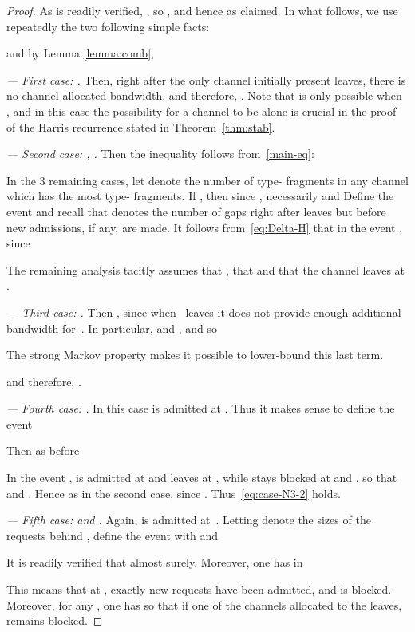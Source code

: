 \documentclass{amsart}
\begin{document}
\begin{proof}
As is readily verified, , so , and hence  as claimed. In what follows, we
use repeatedly the two following simple facts:

and by Lemma \ref{lemma:comb},


\noindent \textit{{--- First case: .}} Then, right after the
only channel initially present leaves, there is no channel allocated bandwidth, and
therefore, . Note that  is only possible
when , and in this case the possibility for a channel
to be alone is crucial in the proof of the Harris recurrence
stated in Theorem~\ref{thm:stab}.



\noindent \textit{{--- Second case: , .}} Then the inequality follows from~\eqref{main-eq}:



In the 3 remaining cases, let  denote the number of type-
fragments in any channel  which has the most type-
fragments. If , then since ,
necessarily  and 
  Define the event  and recall that  denotes the number of gaps
right after  leaves but before new admissions, if any, are
made. It follows from~\eqref{eq:Delta-H} that  in the
event , since
    
The remaining analysis tacitly assumes that , that  and that the channel  leaves at .


\noindent \textit{{--- Third case: .}} Then , since when~ leaves it does not provide enough
additional bandwidth for~. In particular,  and
, and so
    
The strong Markov property makes it possible to lower-bound this
last term.

and therefore, .


    \noindent \textit{{--- Fourth case: .}}
    In this case  is admitted at . Thus it makes sense to define the
    event
    
Then as before
    
In the event ,  is admitted at  and leaves at
, while  stays blocked at  and ,
so that  and . Hence as in the
second case,
 since . Thus~\eqref{eq:case-N3-2} holds.

\noindent \textit{{--- Fifth case:  {\rm and} .}} Again,  is admitted at~. Letting
 denote the sizes of the requests behind , define the event
 with  and
    
It is readily verified that  almost surely.
Moreover, one has in 
    
This means that at , exactly  new requests  have been admitted, and  is blocked. Moreover,
for any , one has  so that if one of the  channels
allocated to the  leaves,  remains blocked.



\end{proof}
\end{document}
